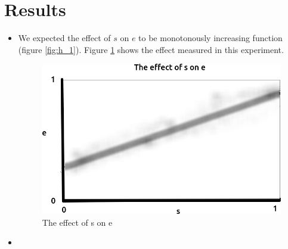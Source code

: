 \documentclass{article}
\begin{document}
\section{Results}
\begin{itemize}

\item We expected the effect of $s$ on $e$ to be monotonously increasing
function (figure \ref{fig:h_1}). Figure \ref{fig:1} shows the effect 
measured in this experiment. 

\begin{figure}[!htbp]
  \includegraphics[width=\textwidth]{fig_1.png}
  \caption{
    The effect of s on e
  }
  \label{fig:1}
\end{figure}


\item

\end{itemize}




\appendix
\end{document}
